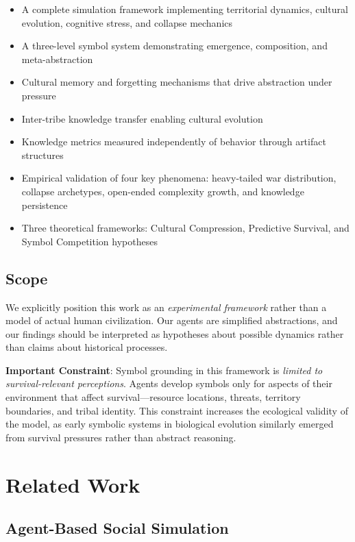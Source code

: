 \documentclass[11pt,a4paper]{article}
\begin{document}
\begin{itemize}
    \item A complete simulation framework implementing territorial dynamics, cultural evolution, cognitive stress, and collapse mechanics
    \item A three-level symbol system demonstrating emergence, composition, and meta-abstraction
    \item Cultural memory and forgetting mechanisms that drive abstraction under pressure
    \item Inter-tribe knowledge transfer enabling cultural evolution
    \item Knowledge metrics measured independently of behavior through artifact structures
    \item Empirical validation of four key phenomena: heavy-tailed war distribution, collapse archetypes, open-ended complexity growth, and knowledge persistence
    \item Three theoretical frameworks: Cultural Compression, Predictive Survival, and Symbol Competition hypotheses
\end{itemize}

\subsection{Scope}

We explicitly position this work as an \textit{experimental framework} rather than a model of actual human civilization. Our agents are simplified abstractions, and our findings should be interpreted as hypotheses about possible dynamics rather than claims about historical processes.

\textbf{Important Constraint}: Symbol grounding in this framework is \textit{limited to survival-relevant perceptions}. Agents develop symbols only for aspects of their environment that affect survival—resource locations, threats, territory boundaries, and tribal identity. This constraint increases the ecological validity of the model, as early symbolic systems in biological evolution similarly emerged from survival pressures rather than abstract reasoning.

\section{Related Work}

\subsection{Agent-Based Social Simulation}
\end{document}

